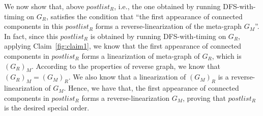\begin{minipage}{0.8\textwidth}
	\xxx
	\xxx
	\xxx
	\xxx
	\xxx
\end{minipage}

We now show that, above $postlist_R$, i.e., the one obtained by running DFS-with-timing on $G_R$,
satisfies the condition that ``the first appearance of connected components in 
this $postlist_R$ forms a reverse-linearization of the meta-graph $G_M$''.
In fact,  since this $postlist_R$ is obtained by running DFS-with-timing on $G_R$,
applying Claim~\ref{fig:claim1},
we know that the first appearance of connected components in $postlist_R$ forms a linearization of meta-graph of $G_R$,
which is $(G_R)_M$.
According to the properties of reverse graph, we know that $(G_R)_M = (G_M)_R$.
We also know that a linearization of $(G_M)_R$ is a reverse-linearization of $G_M$.
Hence, we have that, 
the first appearance of connected components in $postlist_R$ forms a reverse-linearization $G_M$, proving
that $postlist_R$ is the desired special order.
